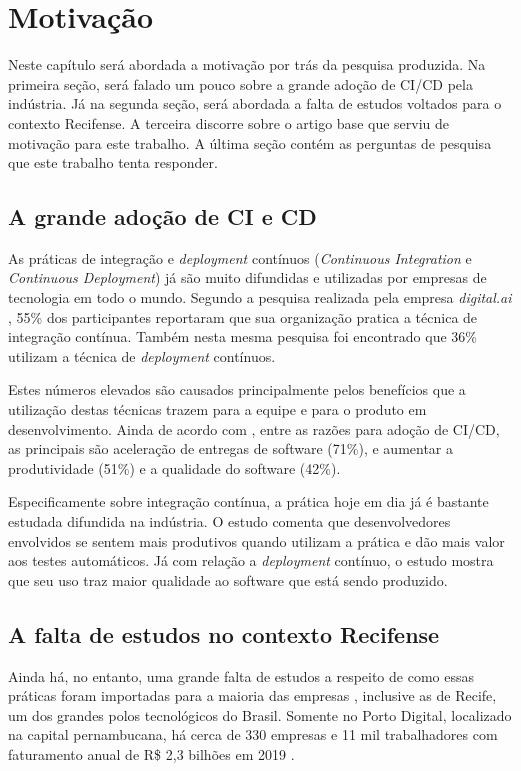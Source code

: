 
\section{Motivação}
Neste capítulo será abordada a motivação por trás da pesquisa produzida. Na primeira seção, será falado um pouco sobre a grande adoção de CI/CD pela indústria. Já na segunda seção, será abordada a falta de estudos voltados para o contexto Recifense. A terceira discorre sobre o artigo base que serviu de motivação para este trabalho. A última seção contém as perguntas de pesquisa que este trabalho tenta responder.

\subsection{A grande adoção de CI e CD}
As práticas de integração e \emph{deployment} contínuos (\emph{Continuous Integration} e \emph{Continuous Deployment}) já são muito difundidas e utilizadas por empresas de tecnologia em todo o mundo. Segundo a pesquisa realizada pela empresa \emph{digital.ai} \cite{stateAgileReport2020}, 55\% dos participantes reportaram que sua organização pratica a técnica de integração contínua. Também nesta mesma pesquisa foi encontrado que 36\% utilizam a técnica de \emph{deployment} contínuos. 

Estes números elevados são causados principalmente pelos benefícios que a utilização destas técnicas trazem para a equipe e para o produto em desenvolvimento. Ainda de acordo com \cite{stateAgileReport2020}, entre as razões para adoção de CI/CD, as principais são aceleração de entregas de software (71\%), e aumentar a produtividade (51\%) e a qualidade do software (42\%). 

Especificamente sobre integração contínua, a prática hoje em dia já é bastante estudada difundida na indústria. O estudo \cite{hilton2016} comenta que desenvolvedores envolvidos se sentem mais produtivos quando utilizam a prática e dão mais valor aos testes automáticos.  Já com relação a \emph{deployment} contínuo, o estudo \cite{savor2015} mostra que seu uso traz maior qualidade ao software que está sendo produzido. 

\subsection{A falta de estudos no contexto Recifense}

Ainda há, no entanto, uma grande falta de estudos a respeito de como essas práticas foram importadas para a maioria das empresas \cite{empiricalStudy2016}, inclusive as de Recife, um dos grandes polos tecnológicos do Brasil. Somente no Porto Digital, localizado na capital pernambucana, há cerca de 330 empresas e 11 mil trabalhadores com faturamento anual de R\$ 2,3 bilhões em 2019 \cite{portoDigital}.

